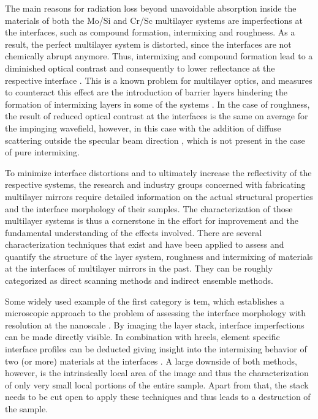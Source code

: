 The main reasons for radiation loss beyond unavoidable absorption inside the materials of both the Mo/Si and Cr/Sc multilayer systems are imperfections at the interfaces, such as compound formation, intermixing and roughness. As a result, the perfect multilayer system is distorted, since the interfaces are not chemically abrupt anymore. Thus, intermixing and compound formation lead to a diminished optical contrast and consequently to lower reflectance at the respective interface \cite{nakajima_interdiffusion_1988}. This is a known problem for multilayer optics, and measures to counteract this effect are the introduction of barrier layers hindering the formation of intermixing layers in some of the systems \cite{braun_grenzflachen-optimierte_2003,braun_mo/si_2002}. In the case of roughness, the result of reduced optical contrast at the interfaces is the same on average for the impinging wavefield, however, in this case with the addition of diffuse scattering outside the specular beam direction \cite{sinha_x-ray_1994}, which is not present in the case of pure intermixing.

To minimize interface distortions and to ultimately increase the reflectivity of the respective systems, the research and industry groups concerned with fabricating multilayer mirrors require detailed information on the actual structural properties and the interface morphology of their samples. The characterization of those multilayer systems is thus a cornerstone in the effort for improvement and the fundamental understanding of the effects involved. 
There are several characterization techniques that exist and have been applied to assess and quantify the structure of the layer system, roughness and intermixing of materials at the interfaces of multilayer mirrors in the past. They can be roughly categorized as direct scanning methods and indirect ensemble methods.

Some widely used example of the first category is \gls{tem}, which establishes a microscopic approach to the problem of assessing the interface morphology with resolution at the nanoscale \cite{stearns_thermally_1990, bajt_investigation_2001}. By imaging the layer stack, interface imperfections can be made directly visible. In combination with \gls{hreels}, element specific interface profiles can be deducted giving insight into the intermixing behavior of two (or more) materials at the interfaces \cite{egerton_electron_2011, prasciolu_thermal_2014}. A large downside of both methods, however, is the intrinsically local area of the image and thus the characterization of only very small local portions of the entire sample. Apart from that, the stack needs to be cut open to apply these techniques and thus leads to a destruction of the sample.

